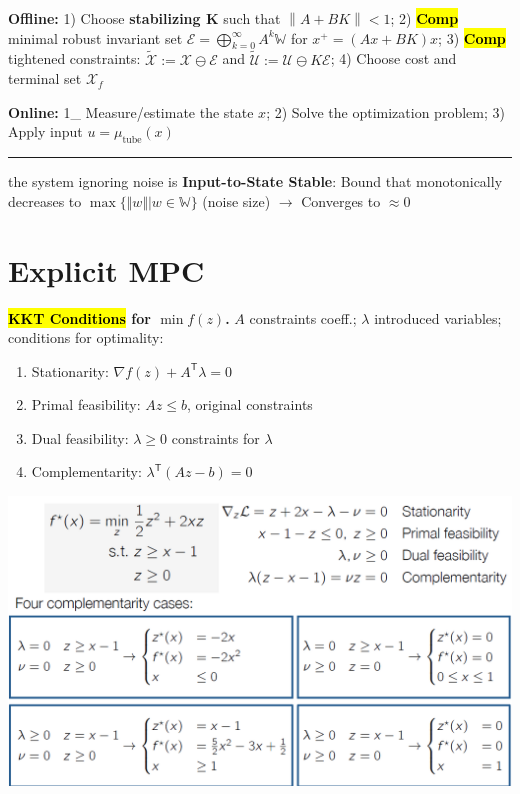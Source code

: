 \documentclass[10pt,a4paper,landscape]{article}
\newcommand{\hlc}[2][yellow]{ {\sethlcolor{#1} \hl{#2}} }
\newcommand{\quadRule}{\vspace{-3pt}\rule{0.23\textwidth}{0.4pt}}
\newcommand{\comp}{\footnotesize{\hlc[cyan]{\textbf{Comp}}}} %
\begin{document}
\begin{multicols*}{4}
\textbf{Offline:} 1)  Choose \textbf{stabilizing K} such that $ \left\| A + BK \right\| < 1$; 2)\comp minimal robust invariant set $\mathcal{E}=\bigoplus_{k=0}^{\infty} A^{k} \mathbb{W}$ for $x^+ = (Ax + BK)x$; 3)\comp tightened constraints: $\tilde{\mathcal{X}} :=  \mathcal{X} \ominus \mathcal{E}$ and $\tilde{\mathcal{U}} := \mathcal{U} \ominus K\mathcal{E}$; 4) Choose cost and terminal set $\mathcal{X}_f$
	
\textbf{Online:} 1_ Measure/estimate the state $x$; 2) Solve the optimization problem; 3) Apply input $u = \mu_{\mathrm{tube}}(x)$

\quadRule

the system ignoring noise is \textbf{Input-to-State Stable}: Bound that monotonically decreases to $\max\{\Vert w \Vert | w \in \mathbb{W} \}$ (noise size) $\rightarrow$ Converges to $\approx 0$

\section{Explicit MPC}

\textbf{\hl{KKT Conditions} for $\min f(z)$.} %
$A$ constraints coeff.; $\lambda$ introduced variables; conditions for optimality:
\begin{enumerate}
    \item Stationarity: $\nabla f(z) + A^{\mathsf{T}}\lambda  = 0$
	\item Primal feasibility: $Az \leq b$, original constraints
	\item Dual feasibility: $\lambda \geq 0$ constraints for $\lambda$
	\item Complementarity: $\lambda^{\mathsf{T}} (Az - b) = 0$
\end{enumerate}
\begin{colfig}
    \centering
    \includegraphics[width=\linewidth]{images/kktExample.png}
    \vspace{-15pt}
\end{colfig}


\end{multicols*}
\end{document}
